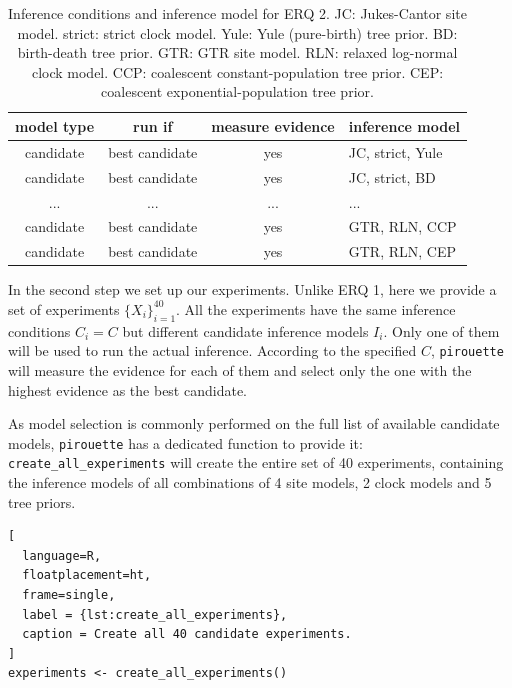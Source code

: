 \documentclass{article}
\begin{document}
\begin{table}
  \begin{tabular}{ | c | c | c | l | }
    \hline
    \textbf{model type} & \textbf{run if} & \textbf{measure evidence} & 
\textbf{inference model} \\ 
    \hline
    candidate & best candidate & yes & JC, strict, Yule \\
    candidate & best candidate & yes & JC, strict, BD   \\
    ...       & ...            & ... & ...              \\
    candidate & best candidate & yes & GTR, RLN, CCP    \\
    candidate & best candidate & yes & GTR, RLN, CEP    \\
    \hline
  \end{tabular}
  \caption{
    Inference conditions and inference model for ERQ 2.
    JC: Jukes-Cantor site model.
    strict: strict clock model.
    Yule: Yule (pure-birth) tree prior.
    BD: birth-death tree prior.
    GTR: GTR site model.
    RLN: relaxed log-normal clock model.
    CCP: coalescent constant-population tree prior.
    CEP: coalescent exponential-population tree prior.
  }
  \label{tab:RQ2}
\end{table}

In the second step we set up our experiments. Unlike ERQ 1, here we provide a 
set of experiments $\{\mathit{X_{i}}\}_{i=1}^{40}$. All the experiments have 
the same inference conditions $\mathit{C_{i}} = \mathit{C}$ but different 
candidate inference models $\mathit{I_{i}}$. Only one of them will be used 
to run the actual inference. According to the specified $\mathit{C}$, 
\verb;pirouette; will measure the evidence for each of them and select only 
the one with the highest evidence as the best candidate.

As model selection is commonly performed on the full list of available candidate models,
\verb;pirouette; has a dedicated function to provide it:
\verb;create_all_experiments; will create the entire set of 40 experiments,
containing the inference models of all combinations of 4 site 
models, 2 clock models and 5 tree priors.

\begin{lstlisting}[
  language=R, 
  floatplacement=ht, 
  frame=single, 
  label = {lst:create_all_experiments},
  caption = Create all 40 candidate experiments.
]
experiments <- create_all_experiments()
\end{lstlisting}
\end{document}
